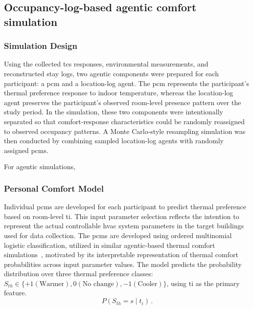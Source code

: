 \subsection{Occupancy-log-based agentic comfort simulation}
\subsubsection{Simulation Design}
Using the collected \ac{tcs} responses, environmental measurements, and reconstructed stay logs, two agentic components were prepared for each participant: a \ac{pcm} and a location-log agent.
The \ac{pcm} represents the participant's thermal preference response to indoor temperature, whereas the location-log agent preserves the participant's observed room-level presence pattern over the study period.
In the simulation, these two components were intentionally separated so that comfort-response characteristics could be randomly reassigned to observed occupancy patterns.
A Monte Carlo-style resampling simulation was then conducted by combining sampled location-log agents with randomly assigned \acp{pcm}.

For agentic simulations, 
\begin{table}[pos=htbp!]
    \centering
    \small
    \caption{Target rooms used for field data collection and simulation cases}
    
    \label{tab:SimuTarget}
\end{table}

\subsubsection{Personal Comfort Model}
Individual \acp{pcm} are developed for each participant to predict thermal preference based on room-level \ac{ti}.
This input parameter selection reflects the intention to represent the actual controllable \ac{hvac} system parameters in the target buildings used for data collection.
The \ac{pcm}s are developed using ordered multinomial logistic classification, utilized in similar agentic-based thermal comfort simulations~\cite{jung_comparative_2019, jung_energy_2020}, motivated by its interpretable representation of thermal comfort probabilities across input parameter values.
The model predicts the probability distribution over three thermal preference classes: $S_{th} \in \{+1 (\text{Warmer}), 0 (\text{No change}), -1 (\text{Cooler})\}$, using \ac{ti} as the primary feature.
\begin{equation}
P(S_{th} = s \mid t_i)\,.
\label{eq:pcm_probability}
\end{equation}

